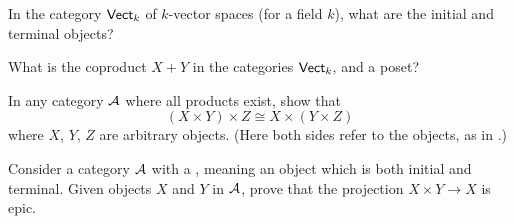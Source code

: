 \begin{problem}
	In the category $\catname{Vect}_k$ of $k$-vector spaces
	(for a field $k$),
	what are the initial and terminal objects?
\end{problem}

\begin{dproblem}
	What is the coproduct $X+Y$ in the categories
	$\catname{Vect}_k$, and a poset?
\end{dproblem}

\begin{problem}
	In any category $\AA$ where all products exist,
	show that \[ (X \times Y) \times Z \cong X \times (Y \times Z) \]
	where $X$, $Y$, $Z$ are arbitrary objects.
	(Here both sides refer to the objects, as in .)
	\label{prob:associative_product}
\end{problem}

\begin{problem}
	\onechili
	Consider a category $\AA$ with a ,
	meaning an object which is both initial and terminal.
	Given objects $X$ and $Y$ in $\AA$,
	prove that the projection $X \times Y \to X$ is epic.
\end{problem}
